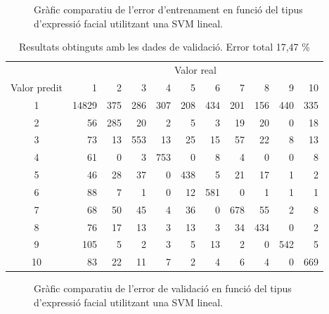 \documentclass[a4paper]{article}
\begin{document}
\begin{figure}[H]
	\centering
	\captionsetup{width=0.8\textwidth}
	\caption{Gràfic comparatiu de l'error d'entrenament en funció del tipus d'expressió facial utilitzant una SVM lineal.}
\end{figure}

\begin{table}[H]
	\centering
	\def\arraystretch{1.2}
	\begin{tabular}{|c|rrrrrrrrrr|}
		\hline
		& \multicolumn{10}{c|}{Valor real} \\
		Valor predit & 1 & 2 & 3 & 4 & 5 & 6 & 7 & 8 & 9 & 10 \\
		\hline
		1 & 14829 & 375 & 286 & 307 & 208 & 434 & 201 & 156 & 440 & 335 \\
		2 & 56 & 285 & 20 & 2 & 5 & 3 & 19 & 20 & 0 & 18 \\
		3 & 73 & 13 & 553 & 13 & 25 & 15 & 57 & 22 & 8 & 13 \\
		4 & 61 & 0 & 3 & 753 & 0 & 8 & 4 & 0 & 0 & 8 \\
		5 & 46 & 28 & 37 & 0 & 438 & 5 & 21 & 17 & 1 & 2 \\
		6 & 88 & 7 & 1 & 0 & 12 & 581 & 0 & 1 & 1 & 1 \\
		7 & 68 & 50 & 45 & 4 & 36 & 0 & 678 & 55 & 2 & 8 \\
		8 & 76 & 17 & 13 & 3 & 13 & 3 & 34 & 434 & 0 & 2 \\
		9 & 105 & 5 & 2 & 3 & 5 & 13 & 2 & 0 & 542 & 5 \\
		10 & 83 & 22 & 11 & 7 & 2 & 4 & 6 & 4 & 0 & 669 \\
		\hline
	\end{tabular}
	\caption{Resultats obtinguts amb les dades de validació. Error total 17,47 \%}
	\label{tab:svm_radial_k2}
\end{table}

\begin{figure}[H]
	\centering
	\captionsetup{width=0.8\textwidth}
	\caption{Gràfic comparatiu de l'error de validació en funció del tipus d'expressió facial utilitzant una SVM lineal.}
\end{figure}
\end{document}
